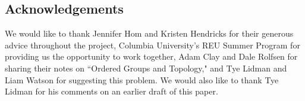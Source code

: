 \subsection{Acknowledgements} We would like to thank Jennifer Hom and Kristen Hendricks for their generous advice throughout the project, Columbia University's REU Summer Program for providing us the opportunity to work together, Adam Clay and Dale Rolfsen for sharing their notes on ``Ordered Groups and Topology," and Tye Lidman and Liam Watson for suggesting this problem. We would also like to thank Tye Lidman for his comments on an earlier draft of this paper.